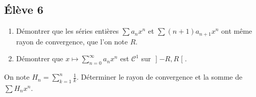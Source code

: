 \documentclass[10pt]{scrartcl}
\begin{document}
    \subsection*{Élève 6}

    \begin{ccp}\hfill
        \begin{enumerate}
            Soit $(a_n)$ une suite de complexes telle que $(|a_{n+1}/a_n|)$ admet une limite.
            \item Démontrer que les séries entières $\sum a_nx^n$ et $\sum(n+1)a_{n+1}x^n$ ont même rayon de convergence, que l'on note $R$. 
            \item Démontrer que $x\mapsto \sum_{n=0}^\infty a_nx^n$ est $\mathcal C^1$ sur $\mathopen]-R,R\mathclose[$.
        \end{enumerate}
    \end{ccp}

    \begin{exo}
        On note $H_n=\sum_{k=1}^n\frac 1k$. 
        Déterminer le rayon de convergence et la somme de $\sum H_nx^n$.
    \end{exo}
\end{document}
